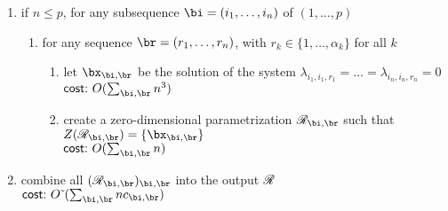 \documentclass[12pt]{article}
\begin{document}
\begin{algorithm}[!h]
\begin{enumerate}
\item if $n \le p$, for any subsequence $\bi = (i_1, \ldots, i_n)$ of $(1, \ldots, p)$
  \begin{enumerate}
  \item for any sequence $\br = (r_1, \ldots, r_n)$, with $r_k \in \{1,\dots,\alpha_k\}$ for all $k$
    \begin{enumerate}
    \item let $\bx_{\bi,\br}$ be the solution of the system $\lambda_{i_1,i_1,r_1}=\dots=\lambda_{i_n,i_n,r_n}=0$\\
      $\text{\sf{cost:~}} O(\sum_{\bi,\br}n^3)$
    \item create a zero-dimensional parametrization $\scrR_{\bi,\br}$ such that $Z(\scrR_{\bi,\br})=\{\bx_{\bi,\br}\}$\\
      $\text{\sf{cost:~}} O(\sum_{\bi,\br}n)$
  \end{enumerate}
\end{enumerate}
\item combine all $(\scrR_{\bi,\br})_{\bi,\br}$ into the output $\mathscr{R}$\\
  $\text{\sf{cost:~}} \softO(\sum_{\bi,\br} n c_{\bi,\br})$
\end{enumerate}
\label{Row}
\end{algorithm}
\end{document}
